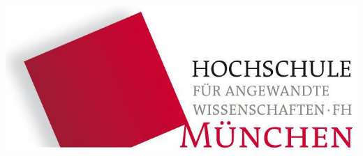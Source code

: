 \begin{titlepage}
	\begin{addmargin}[-1cm]{-3cm}
    \begin{center}
        \large  

        \hfill

        \vfill

        \begingroup
            \color{Maroon}\spacedallcaps{\myTitle} \bigskip \\ 
            \spacedlowsmallcaps{\mySubtitle}
            \bigskip
        \endgroup

        \spacedlowsmallcaps{\myName} \medskip \\ 
		\spacedlowsmallcaps{\myTime}
		
        \vfill
        \includegraphics[width=0.4\linewidth]{images/logo} \\
        
		\vfill
		\myProf \\ 
		\vfill
        \myDegree \\    
        \myFaculty
        \vfill
        \myUni
    \end{center}  
  \end{addmargin}       
\end{titlepage}   